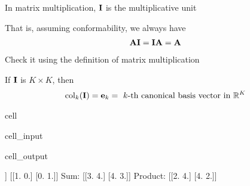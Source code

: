 \documentclass[letterpaper,10pt,english]{jupyterBook}
\begin{document}
\sphinxAtStartPar
In matrix multiplication, \({\bf I}\) is the multiplicative unit

\sphinxAtStartPar
That is, assuming conformability, we always have
\begin{equation*}
\begin{split}
%
{\bf A} {\bf I} = {\bf I} {\bf A} = {\bf A}
%
\end{split}
\end{equation*}
\sphinxAtStartPar
{} Check it using the definition of matrix multiplication

\sphinxAtStartPar
If \({\bf I}\) is \(K \times K\), then
\begin{equation*}
\begin{split}
%
\mathrm{col}_k({\bf I})
= {\bf e}_k
= \text{ $k$-th canonical basis vector in } \mathbb{R}^K
%
\end{split}
\end{equation*}
\begin{sphinxuseclass}{cell}\begin{sphinxVerbatimInput}

\begin{sphinxuseclass}{cell_input}
\begin{sphinxVerbatim}[commandchars=\\\{\}]
   
  \PYG{p}{[}\PYG{p}{[} \PYG{p}{]}
     \PYG{p}{[} \PYG{p}{]}\PYG{p}{]}
   
  
\end{sphinxVerbatim}

\end{sphinxuseclass}\end{sphinxVerbatimInput}
\begin{sphinxVerbatimOutput}

\begin{sphinxuseclass}{cell_output}
\begin{sphinxVerbatim}[commandchars=\\\{\}]
[[2 4]
 [4 2]] [[1. 0.]
 [0. 1.]]
Sum: [[3. 4.]
 [4. 3.]]
Product: [[2. 4.]
 [4. 2.]]
\end{sphinxVerbatim}

\end{sphinxuseclass}\end{sphinxVerbatimOutput}

\end{sphinxuseclass}
\end{document}
